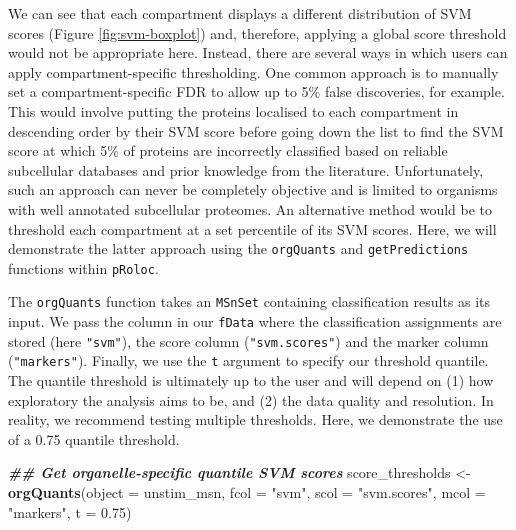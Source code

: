 \documentclass[9pt,a4paper,]{extarticle}
\newenvironment{Shaded}{\begin{snugshade}}{\end{snugshade}}
\newcommand{\AttributeTok}[1]{\textcolor[rgb]{0.13,0.29,0.53}{#1}}
\newcommand{\DocumentationTok}[1]{\textcolor[rgb]{0.56,0.35,0.01}{\textbf{\textit{#1}}}}
\newcommand{\FloatTok}[1]{\textcolor[rgb]{0.00,0.00,0.81}{#1}}
\newcommand{\FunctionTok}[1]{\textcolor[rgb]{0.13,0.29,0.53}{\textbf{#1}}}
\newcommand{\NormalTok}[1]{#1}
\newcommand{\OtherTok}[1]{\textcolor[rgb]{0.56,0.35,0.01}{#1}}
\newcommand{\StringTok}[1]{\textcolor[rgb]{0.31,0.60,0.02}{#1}}
\begin{document}
We can see that each compartment displays a different distribution of SVM scores (Figure \ref{fig:svm-boxplot})
and, therefore, applying a global score threshold would not be appropriate
here. Instead, there are several ways in which users can apply compartment-specific
thresholding. One common approach is to manually set a compartment-specific
FDR to allow up to 5\% false discoveries, for example. This would involve putting
the proteins localised to each compartment in descending order by their SVM score
before going down the list to find the SVM score at which 5\% of proteins are
incorrectly classified based on reliable subcellular databases and prior knowledge
from the literature. Unfortunately, such an approach can never be completely
objective and is limited to organisms with well annotated subcellular proteomes.
An alternative method would be to threshold each compartment at a set percentile
of its SVM scores. Here, we will demonstrate the latter approach using the
\texttt{orgQuants} and \texttt{getPredictions} functions within \texttt{pRoloc}.

The \texttt{orgQuants} function takes an \texttt{MSnSet} containing classification results as
its input. We pass the column in our \texttt{fData} where the classification
assignments are stored (here \texttt{"svm"}), the score column (\texttt{"svm.scores"}) and the
marker column (\texttt{"markers"}). Finally, we use the \texttt{t} argument to specify our
threshold quantile. The quantile threshold is ultimately up to the user and will
depend on (1) how exploratory the analysis aims to be, and (2) the data quality
and resolution. In reality, we recommend testing multiple thresholds. Here, we
demonstrate the use of a 0.75 quantile threshold.

\begin{Shaded}
\begin{Highlighting}[]
\DocumentationTok{\#\# Get organelle{-}specific quantile SVM scores}
\NormalTok{score\_thresholds }\OtherTok{\textless{}{-}} \FunctionTok{orgQuants}\NormalTok{(}\AttributeTok{object =}\NormalTok{ unstim\_msn, }
                              \AttributeTok{fcol =} \StringTok{"svm"}\NormalTok{,}
                              \AttributeTok{scol =} \StringTok{"svm.scores"}\NormalTok{,}
                              \AttributeTok{mcol =} \StringTok{"markers"}\NormalTok{,}
                              \AttributeTok{t =} \FloatTok{0.75}\NormalTok{)}
\end{Highlighting}
\end{Shaded}
\end{document}
